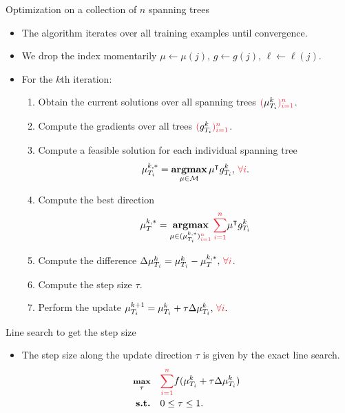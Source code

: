 \documentclass[first=dgreen,second=purple,logo=yellowexc]{aaltoslides}
\begin{document}
\begin{frame}{Optimization on a collection of $n$ spanning trees}
	\begin{itemize}\footnotesize
		\item The algorithm iterates over all training examples until convergence.
		\item We drop the index momentarily $\mu\leftarrow\mu(j),\,g\leftarrow g(j),\,\ell\leftarrow\ell(j)$.
		\item For the $k$th iteration:
		\begin{enumerate}\footnotesize
			\item Obtain the current solutions over all spanning trees ${\color{aaltored}(}\vmu_{T_i}^k{\color{aaltored})_{i=1}^n}$.
			\item Compute the gradients over all trees ${\color{aaltored}(}g_{T_i}^k{\color{aaltored})_{i=1}^n}$.
			\item Compute a feasible solution for each individual spanning tree
			\begin{align*}
				{\vmu}_{T_i}^{k,*} = \underset{\vmu\in\Mcal}{\argmax}\,\vmu\tp g_{T_i}^k,\,{\color{aaltored}\forall i}.
			\end{align*}
			\item Compute the best direction
			\begin{align*}
				{\vmu}_{T}^{k,*} = \underset{\vmu\in({\vmu}_{T_i}^{k,*}){\color{aaltored}_{i=1}^n}}{\argmax}\,{\color{aaltored}\sum_{i=1}^n}\vmu\tp g_{T_i}^k
			\end{align*}
			\item Compute the difference $\Delta\vmu_{T_i}^{k} = {\vmu}_{T_i}^{k} - {\vmu}_{T}^{k,*},\,{\color{aaltored}\forall i}$.
			\item Compute the step size $\tau$.
			\item Perform the update $\vmu_{T_i}^{k+1} = \vmu_{T_i}^k + \tau\Delta\vmu_{T_i}^{k},\,{\color{aaltored}\forall i}.$
		\end{enumerate}
	\end{itemize}
\end{frame}

\begin{frame}{Line search to get the step size}
	\begin{itemize}
		\item The step size along the update direction $\tau$ is given by the exact line search.
		\begin{align*}\footnotesize
			\underset{\tau}{\maximize} &\quad {\color{aaltored}\sum_{i=1}^n}f(\vmu_{T_i}^k + \tau\Delta\vmu_{T_i}^{k})\\
			\st &\quad 0\le\tau\le1.
		\end{align*}
	\end{itemize}
\end{frame}
\end{document}
